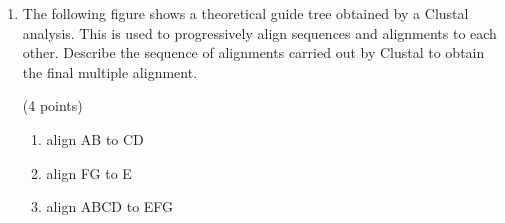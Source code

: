 \documentclass[11pt]{article}
\begin{document}
\begin{enumerate}
\item The following figure shows a theoretical guide tree obtained by a
  Clustal analysis. This is used to progressively align sequences and
  alignments to each other. Describe the sequence of alignments carried out by
  Clustal to obtain the final multiple alignment.
  \begin{figure}[H]
    \begin{tikzpicture}[scale=0.5]
    
    \end{tikzpicture}
  \end{figure}
  (4 points)

\begin{Notes}
  \begin{enumerate}
  \item align AB to CD
  \item align FG to E
  \item align ABCD to EFG
  \end{enumerate}
\end{Notes}

\end{enumerate}
\end{document}

